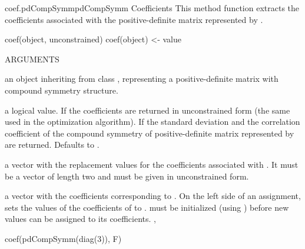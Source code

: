 \documentclass[pdftex]{article} \usepackage{url,graphicx}
\begin{document}
\begin{Helpfile}{coef.pdCompSymm}{pdCompSymm Coefficients}
This method function extracts the coefficients associated with the
positive-definite matrix represented by .
\begin{Example}
coef(object, unconstrained)
coef(object) <- value
\end{Example}
\begin{Argument}{ARGUMENTS}
\item[\Co{object:}]
an object inheriting from class ,
representing a positive-definite matrix with compound symmetry
structure.
\item[\Co{unconstrained:}]
a logical value. If  the coefficients
are returned in unconstrained form (the same used in the optimization
algorithm). If  the standard deviation and the
correlation coefficient of the compound symmetry  of
positive-definite matrix represented by  are
returned. Defaults to .
\item[\Co{value:}]
a vector with the replacement values for the coefficients
associated with . It must be a vector of length two
and must be given in unconstrained form.
\end{Argument}
a vector with the coefficients corresponding to .
On the left side of an assignment, sets the values of the coefficients
of  to .  must be initialized (using
) before new values can be assigned to its
coefficients.
, 
\need 15pt
\vspace{-16pt} 
\begin{Example}
coef(pdCompSymm(diag(3)), F)
\end{Example}
\end{Helpfile}
\end{document}
